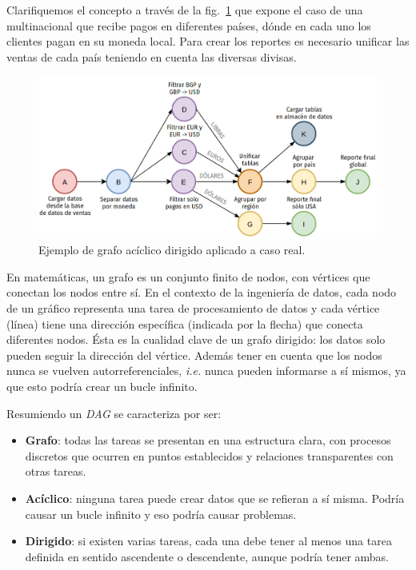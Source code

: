 \documentclass[a4paper,12pt]{article}
\begin{document}
		Clarifiquemos el concepto a través de la fig.~\ref{fig:dag} que expone el caso de una multinacional que recibe pagos en diferentes países, dónde en cada uno los clientes pagan en su moneda local. Para crear los reportes es necesario unificar las ventas de cada país teniendo en cuenta las diversas divisas.
		
		\begin{figure}[H]
			\begin{center}				
				\includegraphics[width=1\textwidth]{dag.png}
				\caption{Ejemplo de grafo acíclico dirigido aplicado a caso real.}
				\label{fig:dag}
			\end{center}
		\end{figure}
		
		En matemáticas, un grafo es un conjunto finito de nodos, con vértices que conectan los nodos entre sí. En el contexto de la ingeniería de datos, cada nodo de un gráfico representa una tarea de procesamiento de datos y cada vértice (línea) tiene una dirección específica (indicada por la flecha) que conecta diferentes nodos. Ésta es la cualidad clave de un grafo dirigido: los datos solo pueden seguir la dirección del vértice. Además tener en cuenta que los nodos nunca se vuelven autorreferenciales, \textit{i.e.} nunca pueden informarse a sí mismos, ya que esto podría crear un bucle infinito.
		
		Resumiendo un \textit{DAG} se caracteriza por ser:
		\begin{itemize}[noitemsep, topsep=2pt]
			\item \textbf{Grafo}: todas las tareas se presentan en una estructura clara, con procesos discretos que ocurren en puntos establecidos y relaciones transparentes con otras tareas.
			\item \textbf{Acíclico}: ninguna tarea puede crear datos que se refieran a sí misma. Podría causar un bucle infinito y eso podría causar problemas.
			\item \textbf{Dirigido}: si existen varias tareas, cada una debe tener al menos una tarea definida en sentido ascendente o descendente, aunque podría tener ambas.
		\end{itemize}
		
\end{document}
